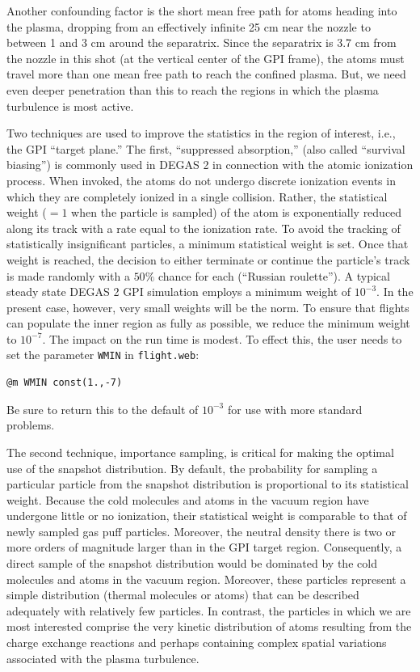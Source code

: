 \documentclass[12pt]{report}
\begin{document}
Another confounding factor is the short mean free
path for atoms heading into the plasma, dropping from an effectively
infinite 25 cm near the nozzle to between 1 and 3 cm around
the separatrix. Since the separatrix is 3.7 cm from the nozzle in this
shot (at the vertical center of the GPI frame), the atoms
must travel more than one mean free path to reach the confined
plasma. But, we need even deeper penetration than this to reach the
regions in which the plasma turbulence is most active.

Two techniques are used to improve the statistics in the region
of interest, i.e., the GPI ``target plane.'' The first, ``suppressed
absorption,'' (also called ``survival biasing'') is commonly used in
DEGAS 2 in connection with the atomic ionization process.
When invoked, the atoms do not undergo discrete ionization events
in which they are completely ionized in a single collision. Rather,
the statistical weight ($=1$ when the particle is
sampled) of the atom
is exponentially reduced along its track with a
rate equal to the ionization
rate. To avoid the tracking of statistically insignificant particles,
a minimum statistical weight is set.
Once that weight is
reached, the decision to either terminate or continue the particle’s
track is made randomly with a $50 \%$ chance for each (``Russian
roulette'').
A typical steady state DEGAS 2 GPI simulation
employs a minimum weight of $10^{-3}$.
In the present case, however, very small
weights will be the norm. To ensure that flights can populate the
inner region as fully as possible, we reduce the minimum weight to
$10^{-7}$. The impact on the run time is modest.  To effect this,
the user needs to set the parameter {\tt WMIN} in {\tt flight.web}:
\begin{verbatim}
@m WMIN const(1.,-7)
\end{verbatim}
Be sure to return this to the default of $10^{-3}$ for use with
more standard problems.

The second technique, importance sampling, is critical for
making the optimal use of the snapshot distribution. By default, the
probability for sampling a particular particle from the
snapshot distribution
is proportional to its statistical weight. Because the cold
molecules and atoms in the vacuum region have undergone little or
no ionization, their statistical weight is comparable to that of newly
sampled gas puff particles. Moreover, the neutral density there is
two or more orders of magnitude larger than in the GPI target
region. Consequently, a direct sample of the snapshot distribution
would be dominated by the cold molecules and atoms in the vacuum
region. Moreover, these particles represent a simple distribution
(thermal molecules or atoms) that can be described adequately
with relatively few particles. In contrast, the particles in which we
are most interested comprise the very kinetic distribution of atoms
resulting from the charge exchange reactions and perhaps containing
complex spatial variations associated with the plasma
turbulence.
\end{document}
